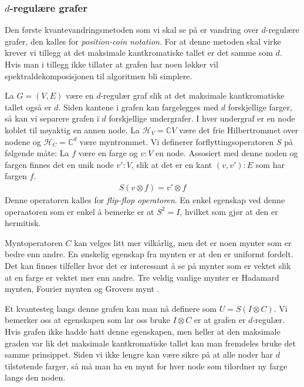     \subsubsection*{$d$-regulære grafer}

        Den første kvantevandringsmetoden som vi skal se på er vandring over $d$-regulære grafer, den kalles for \emph{position-coin notation}. For at denne metoden skal virke krever vi tillegg at det maksimale kantkromatiske tallet er det samme som $d$. Hvis man i tillegg ikke tillater at grafen har noen løkker vil spektraldekomposisjonen til algoritmen bli simplere.

        La $G=(V,E)$ være en $d$-regulær graf slik at det maksimale kantkromatiske tallet også er $d$. Siden kantene i grafen kan fargelegges med $d$ forskjellige farger, så kan vi separere grafen i $d$ forskjellige undergrafer. I hver undergraf er en node koblet til nøyaktig en annen node. La $\mathcal{H}_V = \mathbb{C}V$ være det frie Hilbertrommet over nodene og $\mathcal{H}_C = \mathbb{C}^d$ være myntrommet. Vi definerer forflyttingsoperatoren $S$ på følgende måte: La $f$ være en farge og $v:V$ en node. Assosiert med denne noden og fargen finnes det en unik node $v':V$, slik at det er en kant $(v,v'):E$ som har fargen $f$. 
        \begin{align*}
            S(v\otimes f)=v'\otimes f 
        \end{align*}
        Denne operatoren kalles for \emph{flip-flop operatoren}. En enkel egenskap ved denne operaatoren som er enkel å bemerke er at $S^2 = I$, hvilket som gjør at den er hermitisk. 
        
        Myntoperatoren $C$ kan velges litt mer vilkårlig, men det er noen mynter som er bedre enn andre. En ønskelig egenskap fra mynten er at den er uniformt fordelt. Det kan finnes tilfeller hvor det er interessant å se på mynter som er vektet slik at en farge er vektet mer enn andre. Tre veldig vanlige mynter er Hadamard mynten, Fourier mynten og Grovers mynt .

        Et kvantesteg langs denne grafen kan man nå definere som $U=S(I\otimes C)$. Vi bemerker oss at egenskapen som lar oss bruke $I\otimes C$ er at grafen er $d$-regulær. Hvis grafen ikke hadde hatt denne egenskapen, men heller at den maksimale graden var lik det maksimale kantkromatiske tallet kan man fremdeles bruke det samme prinsippet. Siden vi ikke lengre kan være sikre på at alle noder har $d$ tilstøtende farger, så må man ha en mynt for hver node som tilordner ny farge langs den noden.

